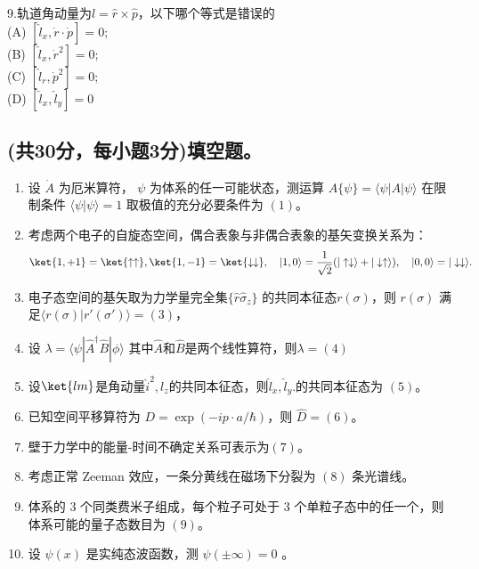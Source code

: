 9.轨道角动量为$\hat{l}=\hat{r}\times \hat{p}$，以下哪个等式是错误的\\
   (A) $[\hat{l}_x, \dot{r} \cdot \dot{p}] = 0$; \\
   (B) $[\hat{l}_x, \dot{r}^2] = 0$; \\
   (C) $[\hat{l}_r, \dot{p}^2] = 0$; \\
   (D) $[\hat{l}_x, \hat{l}_y] = 0$\\

\subsection{(共30分，每小题3分)填空题。}
\begin{enumerate}
    \item 设 $\dot{A}$ 为厄米算符， $\psi$ 为体系的任一可能状态，测运算 $A \{\psi\} = \langle \psi | A | \psi \rangle $ 在限制条件 $\langle \psi | \psi \rangle = 1$ 取极值的充分必要条件为 $(1)$。
    
    \item 考虑两个电子的自旋态空间，偶合表象与非偶合表象的基矢变换关系为：
\[
\ket{1,+1}= \ket{\uparrow\uparrow},\ket{1,-1}=\ket{\downarrow\downarrow}, \quad |1,0\rangle = \frac{1}{\sqrt{2}}(|\uparrow\downarrow\rangle + |\downarrow\uparrow\rangle), \quad |0,0\rangle = |\downarrow\downarrow\rangle.~
\]
    
    \item 电子态空间的基矢取为力学量完全集$\{\hat{r}\hat{\sigma}_z\}$ 的共同本征态$r(\sigma)$，则 $r(\sigma)$ 满足$\langle r(\sigma) | r'(\sigma') \rangle =(3)$，
 
    \item 设 $\lambda=\langle \psi |\hat{A}^\dagger \hat{B} | \phi \rangle$ 其中$\hat{A}$和$\hat{B}$是两个线性算符，则$\lambda =(4)$
    
    \item 设$\ket{lm}$是角动量{$\hat{i}^2,l_z$}的共同本征态，则{$\hat{l}_x,\hat{l}_y$}.的共同本征态为 $(5)$。
    
    \item 已知空间平移算符为 $D = \exp(-ip \cdot a/\hbar)$，则 $\hat D = (6)$。
    
    \item 壁于力学中的能量-时间不确定关系可表示为$(7)$。
    
    \item 考虑正常 Zeeman 效应，一条分黄线在磁场下分裂为 $(8)$ 条光谱线。
    
    \item 体系的 3 个同类费米子组成，每个粒子可处于 3 个单粒子态中的任一个，则体系可能的量子态数目为 $(9)$。
    
    \item 设 $\psi(x)$ 是实纯态波函数，测 $\psi(\pm\infty) = 0$ 。
\end{enumerate}

